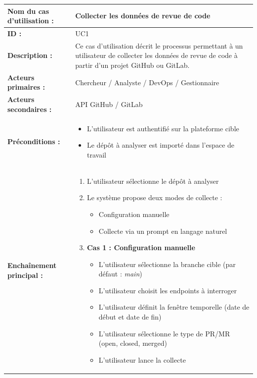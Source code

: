 \begin{tabularx}{\textwidth}{|l|X|}
\hline

\textbf{Nom du cas d’utilisation :} & Collecter les données de revue de code \\ \hline
\textbf{ID :} & UC1 \\ \hline

\textbf{Description :} & 
Ce cas d’utilisation décrit le processus permettant à un utilisateur de collecter les données de revue de code à partir d’un projet GitHub ou GitLab. \\ \hline

\textbf{Acteurs primaires :} & Chercheur / Analyste / DevOps / Gestionnaire \\ \hline
\textbf{Acteurs secondaires :} & API GitHub / GitLab \\ \hline

\textbf{Préconditions :} & 
\begin{itemize}
    \item L’utilisateur est authentifié sur la plateforme cible
    \item Le dépôt à analyser est importé dans l’espace de travail
\end{itemize} \\ \hline

\textbf{Enchaînement principal :} & 
\begin{enumerate}
    \item L’utilisateur sélectionne le dépôt à analyser
    \item Le système propose deux modes de collecte :
    \begin{itemize}
        \item Configuration manuelle
        \item Collecte via un prompt en langage naturel
    \end{itemize}

    \item \textbf{Cas 1 : Configuration manuelle}
    \begin{itemize}
        \item L’utilisateur sélectionne la branche cible (par défaut : \textit{main})
        \item L’utilisateur choisit les endpoints à interroger
        \item L’utilisateur définit la fenêtre temporelle (date de début et date de fin)
        \item L’utilisateur sélectionne le type de PR/MR (open, closed, merged)
        \item L’utilisateur lance la collecte
    \end{itemize}


\end{enumerate}
\end{tabularx}

